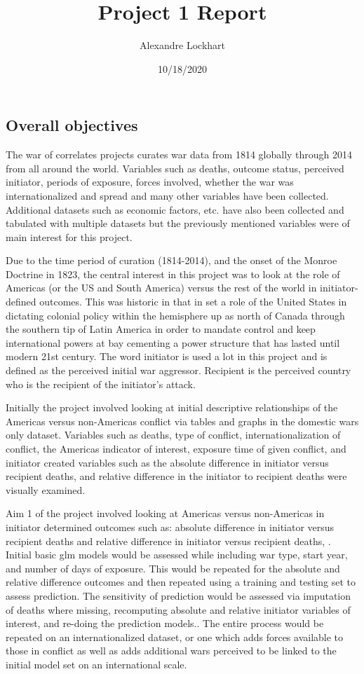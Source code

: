 \documentclass[
]{article}
\title{Project 1 Report}
\author{Alexandre Lockhart}
\date{10/18/2020}
\begin{document}
\maketitle

\hypertarget{overall-objectives}{%
\subsection{Overall objectives}\label{overall-objectives}}

The war of correlates projects curates war data from 1814 globally
through 2014 from all around the world. Variables such as deaths,
outcome status, perceived initiator, periods of exposure, forces
involved, whether the war was internationalized and spread and many
other variables have been collected. Additional datasets such as
economic factors, etc. have also been collected and tabulated with
multiple datasets but the previously mentioned variables were of main
interest for this project.

Due to the time period of curation (1814-2014), and the onset of the
Monroe Doctrine in 1823, the central interest in this project was to
look at the role of Americas (or the US and South America) versus the
rest of the world in initiator-defined outcomes. This was historic in
that in set a role of the United States in dictating colonial policy
within the hemisphere up as north of Canada through the southern tip of
Latin America in order to mandate control and keep international powers
at bay cementing a power structure that has lasted until modern 21st
century. The word initiator is used a lot in this project and is defined
as the perceived initial war aggressor. Recipient is the perceived
country who is the recipient of the initiator's attack.

Initially the project involved looking at initial descriptive
relationships of the Americas versus non-Americas conflict via tables
and graphs in the domestic wars only dataset. Variables such as deaths,
type of conflict, internationalization of conflict, the Americas
indicator of interest, exposure time of given conflict, and initiator
created variables such as the absolute difference in initiator versus
recipient deaths, and relative difference in the initiator to recipient
deaths were visually examined.

Aim 1 of the project involved looking at Americas versus non-Americas in
initiator determined outcomes such as: absolute difference in initiator
versus recipient deaths and relative difference in initiator versus
recipient deaths, . Initial basic glm models would be assessed while
including war type, start year, and number of days of exposure. This
would be repeated for the absolute and relative difference outcomes and
then repeated using a training and testing set to assess prediction. The
sensitivity of prediction would be assessed via imputation of deaths
where missing, recomputing absolute and relative initiator variables of
interest, and re-doing the prediction models.. The entire process would
be repeated on an internationalized dataset, or one which adds forces
available to those in conflict as well as adds additional wars perceived
to be linked to the initial model set on an international scale.
\end{document}
